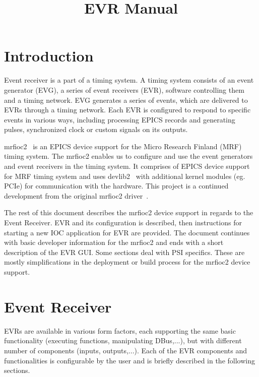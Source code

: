 \documentclass[12pt,a4paper]{article}
\title{EVR Manual}
\date{}
\let\stdsection\section
\renewcommand\section{\newpage\stdsection}
\begin{document}
\maketitle


\tableofcontents


\section{Introduction}\label{sec:Introduction}
Event receiver is a part of a timing system. A timing system consists of an event generator (EVG), a series of event receivers (EVR), software controlling them and a timing network. EVG generates a series of events, which are delivered to EVRs through a timing network. Each EVR is configured to respond to specific events in various ways, including processing EPICS records and generating pulses, synchronized clock or custom signals on its outputs.

mrfioc2~\cite{git_mrfioc2} is an EPICS device support for the Micro Research Finland (MRF)~\cite{mrf} timing system. The mrfioc2 enables us to configure and use the event generators and event receivers in the timing system. It comprises of EPICS device support for MRF timing system and uses devlib2~\cite{devlib2} with additional kernel modules (eg. PCIe) for communication with the hardware. This project is a continued development from the original mrfioc2 driver~\cite{mrfioc2}.

The rest of this document describes the mrfioc2 device support in regards to the Event Receiver. EVR and its configuration is described, then instructions for starting a new IOC application for EVR are provided. The document continues with basic developer information for the mrfioc2 and ends with a short description of the EVR GUI. Some sections deal with PSI specifics. These are mostly simplifications in the deployment or build process for the mrfioc2 device support.

\section{Event Receiver}\label{sec:Event Receiver}
EVRs are available in various form factors, each supporting the same basic functionality (executing functions, manipulating DBus,...), but with different number of components (inputs, outputs,...). Each of the EVR components and functionalities is configurable by the user and is briefly described in the following sections.
\end{document}
